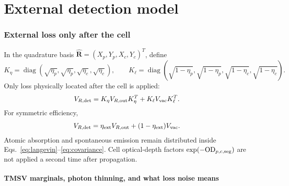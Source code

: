 \documentclass[11pt,a4paper]{article}
\begin{document}
\part{External detection model}

\section{External loss only after the cell}

In the quadrature basis
$\hat{\bm R}=(X_p,Y_p,X_c,Y_c)^T$, define
\[
K_\eta=\operatorname{diag}(\sqrt{\eta_p},\sqrt{\eta_p},
\sqrt{\eta_c},\sqrt{\eta_c}),\qquad
K_\ell=\operatorname{diag}(\sqrt{1-\eta_p},\sqrt{1-\eta_p},
\sqrt{1-\eta_c},\sqrt{1-\eta_c}).
\]
Only loss physically located after the cell is applied:
\begin{equation}
V_{R,\rm det}=K_\eta V_{R,\rm out}K_\eta^T
+K_\ell V_{\rm vac}K_\ell^T .
\label{eq:detection-loss}
\end{equation}
For symmetric efficiency,
\[
V_{R,\rm det}=\eta_{\rm ext}V_{R,\rm out}
+(1-\eta_{\rm ext})V_{\rm vac}.
\]
Atomic absorption and spontaneous emission remain distributed inside
Eqs.~\eqref{eq:langevin}--\eqref{eq:covariance}. Cell optical-depth factors
$\exp(-{\rm OD}_{p,c,\rm seg})$ are not applied a second time after
propagation.

\subsection{TMSV marginals, photon thinning, and what loss noise means}
\label{sec:tmsv-loss-statistics}
\end{document}
